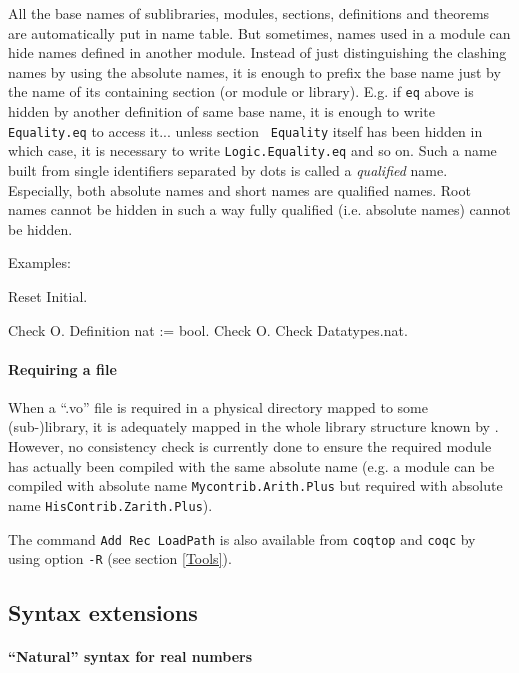 \documentclass[11pt]{article}
\begin{document}
All the base names of sublibraries, modules, sections, definitions and
theorems are automatically put in {\Coq} name table. But sometimes,
names used in a module can hide names defined in another module.
Instead of just distinguishing the clashing names by using the
absolute names, it is enough to prefix the base name just by the name
of its containing section (or module or library). E.g. if {\tt eq}
above is hidden by another definition of same base name, it is enough
to write {\tt Equality.eq} to access it... unless section {\tt
Equality} itself has been hidden in which case, it is necessary to
write {\tt Logic.Equality.eq} and so on. Such a name built from
single identifiers separated by dots is called a {\it qualified}
name. Especially, both absolute names and short names are qualified
names. Root names cannot be hidden in such a way fully qualified
(i.e. absolute names) cannot be hidden.

Examples:

\begin{coq_eval}
Reset Initial.
\end{coq_eval}

\begin{coq_example}
Check O.
Definition nat := bool.
Check O.
Check Datatypes.nat.
\end{coq_example}

\paragraph{Requiring a file}

When a ``.vo'' file is required in a physical directory mapped to some
(sub-)library, it is adequately mapped in the whole library structure
known by \Coq. However, no consistency check is currently done to
ensure the required module has actually been compiled with the same
absolute name (e.g. a module can be compiled with absolute name
{\tt Mycontrib.Arith.Plus} but required with absolute name
{\tt HisContrib.Zarith.Plus}).

The command {\tt Add Rec LoadPath} is also available from {\tt coqtop}
and {\tt coqc} by using option \verb=-R= (see section \ref{Tools}).

\subsection{Syntax extensions}
\label{SyntaxExtensions}

\paragraph{``Natural'' syntax for real numbers}
\end{document}
